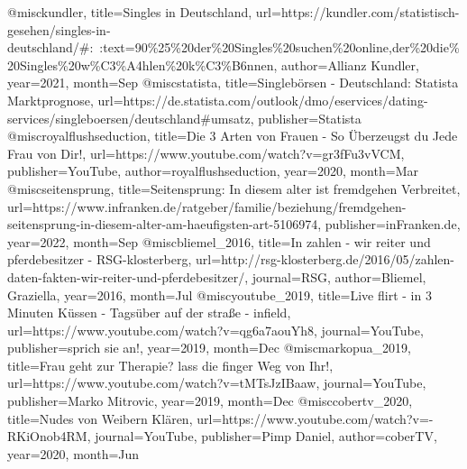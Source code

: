 \documentclass[german, version-2020-11]{uzl-thesis}
\begin{document}
  
  
  
  


  \begin{bibtex-entries}
    @misc{kundler, 
      title={Singles in Deutschland}, 
      url={https://kundler.com/statistisch-gesehen/singles-in-deutschland/#:~:text=90\%25\%20der\%20Singles\%20suchen\%20online,der\%20die\%20Singles\%20w\%C3\%A4hlen\%20k\%C3\%B6nnen}, 
      author={Allianz Kundler}, 
      year={2021}, 
      month={Sep}
    } 
    @misc{statista, 
      title={Singlebörsen - Deutschland: Statista Marktprognose},
      url={https://de.statista.com/outlook/dmo/eservices/dating-services/singleboersen/deutschland#umsatz},
      publisher={Statista}
    } 
    @misc{royalflushseduction, 
      title={Die 3 Arten von Frauen - So Überzeugst du Jede Frau von Dir!}, 
      url={https://www.youtube.com/watch?v=gr3fFu3vVCM}, 
      publisher={YouTube}, 
      author={royalflushseduction}, 
      year={2020}, 
      month={Mar}
    } 
    @misc{seitensprung, 
      title={Seitensprung: In diesem alter ist fremdgehen Verbreitet}, 
      url={https://www.infranken.de/ratgeber/familie/beziehung/fremdgehen-seitensprung-in-diesem-alter-am-haeufigsten-art-5106974},  
      publisher={inFranken.de},  
      year={2022}, 
      month={Sep}
    }
    @misc{bliemel_2016, 
      title={In zahlen - wir reiter und pferdebesitzer - RSG-klosterberg}, 
      url={http://rsg-klosterberg.de/2016/05/zahlen-daten-fakten-wir-reiter-und-pferdebesitzer/}, 
      journal={RSG}, 
      author={Bliemel, Graziella}, 
      year={2016}, 
      month={Jul}
    } 
    @misc{youtube_2019, 
      title={Live flirt - in 3 Minuten Küssen - Tagsüber auf der straße - infield}, 
      url={https://www.youtube.com/watch?v=qg6a7aouYh8}, 
      journal={YouTube}, 
      publisher={sprich sie an!}, 
      year={2019}, 
      month={Dec}
    } 
    @misc{markopua_2019, 
      title={Frau geht zur Therapie? lass die finger Weg von Ihr!}, 
      url={https://www.youtube.com/watch?v=tMTsJzIBaaw}, 
      journal={YouTube}, 
      publisher={Marko Mitrovic}, 
      year={2019}, 
      month={Dec}
    } 
    @misc{cobertv_2020, 
      title={Nudes von Weibern Klären}, 
      url={https://www.youtube.com/watch?v=-RKiOnob4RM}, 
      journal={YouTube}, 
      publisher={Pimp Daniel}, 
      author={coberTV}, 
      year={2020}, 
      month={Jun}
    } 
  \end{bibtex-entries}
\end{document}
